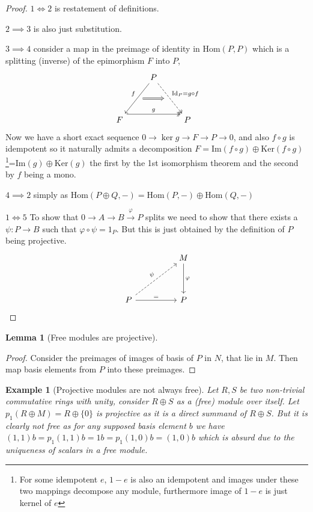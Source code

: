 \documentclass[12pt]{report}
\numberwithin{equation}{section}
\newcommand{\Hom}{{\mathrm{Hom}}}
\newcommand{\image}{{\mathrm{Im}}}
\newcommand{\kernel}{{\mathrm{Ker}}}
\newcounter{dummy} \numberwithin{dummy}{section}
\newtheorem{lemma}[dummy]{Lemma}
\newtheorem{example}[dummy]{Example}
\begin{document}
	\begin{proof}
		$1 \iff 2$ is restatement of definitions.
		
		$2 \implies 3$ is also just substitution.
		
		$3 \implies 4$ consider a map in the preimage of identity in $\Hom(P,P)$ which is a splitting (inverse) of the epimorphism $F$ into $P$,
		\[\begin{tikzcd}
			& P \\
			\\
			F && P
			\arrow["g", shift left=3, two heads, from=3-1, to=3-3]
			\arrow[""{name=0, anchor=center, inner sep=0}, "f"', from=1-2, to=3-1]
			\arrow[""{name=1, anchor=center, inner sep=0}, "{\mathrm{Id}_P=g \circ f}", dashed, two heads, from=1-2, to=3-3]
			\arrow[shorten <=6pt, shorten >=6pt, Rightarrow, from=0, to=1]
		\end{tikzcd}\]
		Now we have a short exact sequence $0 \to \ker g \to F \to P \to 0$, and also $f\circ g $ is idempotent so it naturally admits a decomposition $F = \image(f \circ g) \oplus \kernel (f \circ g)$\footnote{For some idempotent $e$, $1-e$ is also an idempotent and images under these two mappings decompose any module, furthermore image of $1-e$ is just kernel of $e$}=$\image (g) \oplus \kernel (g)$ the first by the 1st isomorphism theorem and the second by $f $ being a mono.
		
		$4 \implies 2$ simply as $\Hom (P \oplus Q,-) = \Hom(P,-) \oplus \Hom(Q,-)$
		
		$1 \iff 5$ To show that $0\to A \to B \xrightarrow{\varphi} P$ splits we need to show that there exists a $\psi: P \to B$ such that $\varphi \circ \psi = 1_P$. But this is just obtained by the definition of $P$ being projective.
		\[\begin{tikzcd}
			&& M \\
			\\
			P && P
			\arrow["\varphi", from=1-3, to=3-3]
			\arrow["\psi", dashed, from=3-1, to=1-3]
			\arrow["{=}", from=3-1, to=3-3]
		\end{tikzcd}\]
		
	\end{proof}
	\begin{lemma}[Free modules are projective]
	\end{lemma}
	\begin{proof}
		Consider the preimages of images of basis of $P$ in $N$, that lie in $M$. Then map basis elements from $P$ into these preimages.
	\end{proof}
	\begin{example}[Projective modules are not always free]
		Let $R,S $ be two non-trivial commutative rings with unity, consider $R \oplus S$ as a (free) module over itself. Let $p_1(R \oplus M)=R \oplus \{0\}$ is projective as it is a direct summand of $R \oplus S$. But it is clearly not free as for any supposed basis element $b$ we have $(1,1) b = p_1 (1,1) b=1b=p_1(1,0) b=(1,0)b$ which is absurd due to the uniqueness of scalars in a free module.
	\end{example}
	
\end{document}
